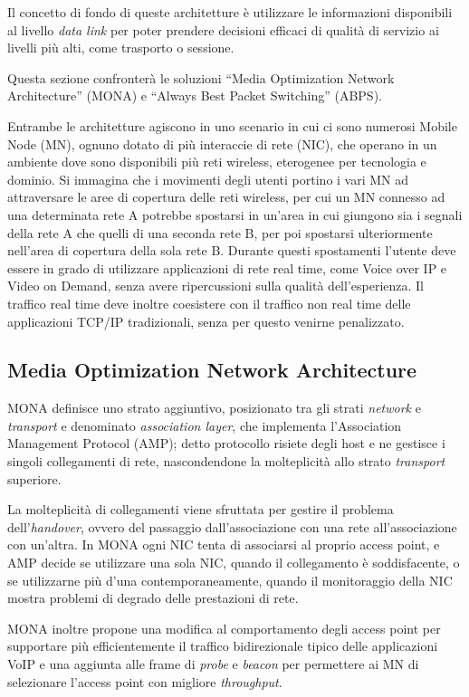 \documentclass[12pt,a4paper,openright,twoside]{book}
\begin{document}
Il concetto di fondo di queste architetture è utilizzare le
informazioni disponibili al livello \emph{data link} per poter
prendere decisioni efficaci di qualità di servizio ai livelli più
alti, come trasporto o sessione.

Questa sezione confronterà le soluzioni ``Media Optimization Network
Architecture'' (MONA) e ``Always Best Packet Switching'' (ABPS).

Entrambe le architetture agiscono in uno scenario in cui ci sono
numerosi Mobile Node (MN), ognuno dotato di più interaccie di rete
(NIC), che operano in un ambiente dove sono disponibili più reti
wireless, eterogenee per tecnologia e dominio. Si immagina che i
movimenti degli utenti portino i vari MN ad attraversare le aree di
copertura delle reti wireless, per cui un MN connesso ad una
determinata rete A potrebbe spostarsi in un'area in cui giungono sia i
segnali della rete A che quelli di una seconda rete B, per poi
spostarsi ulteriormente nell'area di copertura della sola rete
B. Durante questi spostamenti l'utente deve essere in grado di
utilizzare applicazioni di rete real time, come Voice over IP e Video
on Demand, senza avere ripercussioni sulla qualità dell'esperienza. Il
traffico real time deve inoltre coesistere con il traffico non real
time delle applicazioni TCP/IP tradizionali, senza per questo venirne
penalizzato.

\subsection{Media Optimization Network Architecture}

MONA definisce uno strato aggiuntivo, posizionato tra gli strati
\emph{network} e \emph{transport} e denominato \emph{association
  layer}, che implementa l'Association Management Protocol (AMP);
detto protocollo risiete degli host e ne gestisce i singoli
collegamenti di rete, nascondendone la molteplicità allo strato
\emph{transport} superiore.

La molteplicità di collegamenti viene sfruttata per gestire il
problema dell'\emph{handover}, ovvero del passaggio dall'associazione
con una rete all'associazione con un'altra. In MONA ogni NIC tenta di
associarsi al proprio access point, e AMP decide se utilizzare una
sola NIC, quando il collegamento è soddisfacente, o se utilizzarne più
d'una contemporaneamente, quando il monitoraggio della NIC mostra
problemi di degrado delle prestazioni di rete.

MONA inoltre propone una modifica al comportamento degli access point
per supportare più efficientemente il traffico bidirezionale tipico
delle applicazioni VoIP e una aggiunta alle frame di \emph{probe} e
\emph{beacon} per permettere ai MN di selezionare l'access point con
migliore \emph{throughput}.
\end{document}
